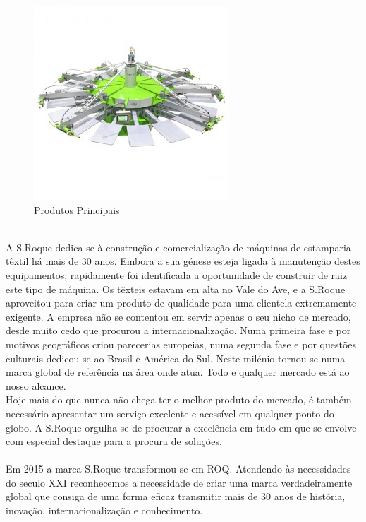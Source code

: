 {\begin{figure}[ht]
\begin{center}
\includegraphics[scale=0.5]{"./image/ROQ/maquinas/You-600x600-275x275"}
\end{center}
\caption{Produtos Principais}
\end{figure}
\\
\newpage
A S.Roque dedica-se à construção e comercialização de máquinas de estamparia têxtil há mais de 30 anos. Embora a sua génese esteja ligada à manutenção destes equipamentos, rapidamente foi identificada a oportunidade de construir de raiz este tipo de máquina. Os têxteis estavam em alta no Vale do Ave, e a S.Roque aproveitou para criar um produto de qualidade para uma clientela extremamente exigente. A empresa não se contentou em servir apenas o seu nicho de mercado, desde muito cedo que procurou a internacionalização. Numa primeira fase e por motivos geográficos criou parecerias europeias, numa segunda fase e por questões culturais dedicou-se ao Brasil e América do Sul. Neste milénio tornou-se numa marca global de referência na área onde atua. Todo e qualquer mercado está ao nosso alcance.\\
Hoje mais do que nunca não chega ter o melhor produto do mercado, é também necessário apresentar um serviço excelente e acessível em qualquer ponto do globo. A S.Roque orgulha-se de procurar a excelência em tudo em que se envolve com especial destaque para a procura de soluções.\\
\\
Em 2015 a marca S.Roque transformou-se em ROQ. Atendendo às necessidades do seculo XXI reconhecemos a necessidade de criar uma marca verdadeiramente global que consiga de uma forma eficaz transmitir mais de 30 anos de história, inovação, internacionalização e conhecimento.

}
